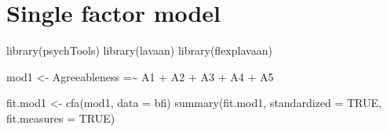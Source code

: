 \documentclass[
  letterpaper,
  DIV=11,
  numbers=noendperiod]{scrreprt}
\newenvironment{Shaded}{\begin{snugshade}}{\end{snugshade}}
\newcommand{\AttributeTok}[1]{\textcolor[rgb]{0.40,0.45,0.13}{#1}}
\newcommand{\ConstantTok}[1]{\textcolor[rgb]{0.56,0.35,0.01}{#1}}
\newcommand{\FunctionTok}[1]{\textcolor[rgb]{0.28,0.35,0.67}{#1}}
\newcommand{\NormalTok}[1]{\textcolor[rgb]{0.00,0.23,0.31}{#1}}
\newcommand{\OtherTok}[1]{\textcolor[rgb]{0.00,0.23,0.31}{#1}}
\newcommand{\StringTok}[1]{\textcolor[rgb]{0.13,0.47,0.30}{#1}}
\begin{document}

\chapter{Single factor model}\label{single-factor-model}

\begin{Shaded}
\begin{Highlighting}[]
\FunctionTok{library}\NormalTok{(psychTools)}
\FunctionTok{library}\NormalTok{(lavaan)}
\FunctionTok{library}\NormalTok{(flexplavaan)}

\NormalTok{mod1 }\OtherTok{\textless{}{-}} \StringTok{\textquotesingle{}}
\StringTok{Agreeableness =\textasciitilde{} A1 + A2 + A3 + A4 + A5}
\StringTok{\textquotesingle{}}

\NormalTok{fit.mod1 }\OtherTok{\textless{}{-}} \FunctionTok{cfa}\NormalTok{(mod1, }\AttributeTok{data =}\NormalTok{ bfi)}
\FunctionTok{summary}\NormalTok{(fit.mod1, }\AttributeTok{standardized =} \ConstantTok{TRUE}\NormalTok{, }\AttributeTok{fit.measures =} \ConstantTok{TRUE}\NormalTok{)}
\end{Highlighting}
\end{Shaded}
\end{document}
